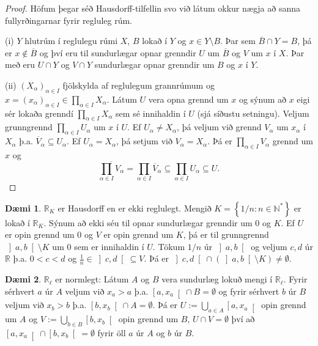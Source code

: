 \documentclass[a4paper,icelandic]{book}
\theoremstyle{definition}
\newtheorem{daemi}{Dæmi}[section]
\theoremstyle{plain}
\theoremstyle{remark}
\newcommand{\R}{\mathbb{R}} %
\newcommand{\N}{\mathbb{N}} %
\begin{document}
\begin{proof}
  Höfum þegar séð Hausdorff-tilfellin svo við látum okkur nægja að sanna
  fullyrðingarnar fyrir regluleg rúm.

  (i) $Y$ hlutrúm í reglulegu rúmi $X$, $B$ lokað í $Y$ og $x\in
  Y\setminus B$. Þar sem $\overline B \cap Y = B$, þá er $x\notin
  \overline B$ og því eru til sundurlægar opnar grenndir $U$ um
  $\overline B$ og $V$ um $x$ í $X$. Þar með eru $U\cap Y$ og $V\cap Y$
  sundurlægar opnar grenndir um $B$ og $x$ í $Y$. 

  (ii) $(X_\alpha)_{\alpha\in I}$ fjölskylda af reglulegum grannrúmum og
  $x = (x_\alpha)_{\alpha\in I}\in \prod_{\alpha\in I} X_\alpha$. Látum
  $U$ vera opna grennd um $x$ og sýnum að $x$ eigi sér lokaða grenndí
  $\prod_{\alpha\in I} X_\alpha$ sem sé innihaldin í $U$ (sjá síðustu
  setningu). Veljum grunngrennd $\prod_{\alpha\in I} U_\alpha$ um $x$ í
  $U$. Ef $U_\alpha\neq X_\alpha$, þá veljum við grennd $V_\alpha$ um
  $x_\alpha$ í $X_\alpha$ þ.a. $\overline V_\alpha\subseteq U_\alpha$.
  Ef $U_\alpha = X_\alpha$, þá setjum við $V_\alpha=X_\alpha$. Þá er
  $\prod_{\alpha\in I} V_\alpha$ grennd um $x$ og\[
  \overline{\prod_{\alpha\in I} V_\alpha}
  = \prod_{\alpha\in I} \overline V_\alpha
  \subseteq \prod_{\alpha\in I} U_\alpha
  \subseteq U.
  \]
\end{proof}
\begin{daemi}
  $\R_K$ er Hausdorff en er ekki reglulegt. Mengið $K=\left\{
  1/n:n\in\N^* \right\}$ er lokað í $\R_K$. Sýnum að ekki séu til opnar
  sundurlægar grenndir um $0$ og $K$. Ef $U$ er opin grennd um $0$ og
  $V$ er opin grennd um $K$, þá er til grunngrennd
  $\left]a,b\right[\setminus K$ um $0$ sem er innihaldin í $U$. Tökum
  $1/n$ úr $\left]a,b\right[$ og veljum $c,d$ úr $\R$ þ.a. $0<c<d$ og
  $\frac 1n\in\left]c,d\right[\subseteq V$. Þá er
  $\left]c,d\right[\cap\left( \left]a,b\right[\setminus K \right) \neq
  \emptyset$.
\end{daemi}
\begin{daemi}
  $\R_\ell$ er  normlegt: Látum $A$ og $B$ vera sundurlæg lokuð mengi í
  $\R_\ell$. Fyrir sérhvert $a$ úr $A$ veljum við $x_a>a$ þ.a.
  $\left[a,x_a\right[\cap B =\emptyset$ og fyrir sérhvert $b$ úr $B$
  veljum við $x_b>b$ þ.a. $\left[b,x_b\right[\cap A=\emptyset$. Þá er
  $U:= \bigcup_{a\in A}\left[a,x_a\right[$ opin grennd um $A$ og $V :=
  \bigcup_{b\in B}\left[b,x_b\right[$ opin grennd um $B$, $U\cap V =
  \emptyset$ því að $\left[a,x_a\right[\cap\left[b,x_b\right[=\emptyset$
  fyrir öll $a$ úr $A$ og $b$ úr $B$.
\end{daemi}
\end{document}
